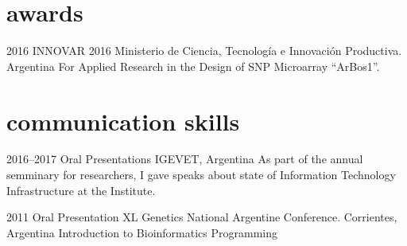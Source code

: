 \documentclass[]{friggeri-cv} %
\begin{document}

\section{awards}

\begin{entrylist}


\entry
{2016}
{INNOVAR 2016}
{Ministerio de Ciencia, Tecnología e Innovación Productiva. Argentina}
{For Applied Research in the Design of SNP Microarray “ArBos1”.}


\end{entrylist}


\section{communication skills}

\begin{entrylist}


\entry
{2016--2017}
{Oral Presentations}
{IGEVET, Argentina}
{As part of the annual semminary for researchers, I gave speaks about state of Information Technology Infrastructure at the Institute.}


\entry
{2011}
{Oral Presentation}
{XL Genetics National Argentine Conference. Corrientes, Argentina}
{Introduction to Bioinformatics Programming}


\end{entrylist}

\end{document}
